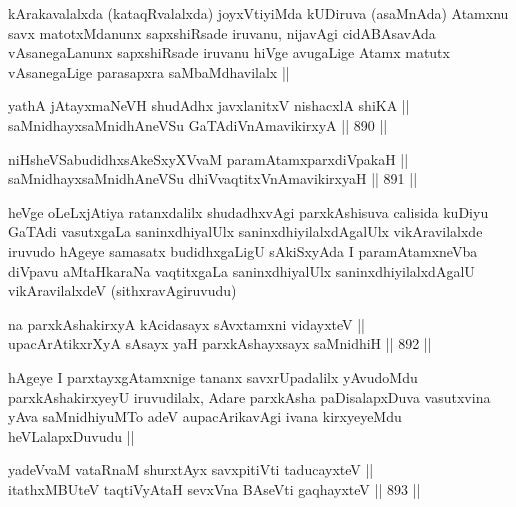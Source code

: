 \begin{artha}
kArakavalalxda (kataqRvalalxda) joyxVtiyiMda kUDiruva (asaMnAda) Atamxnu savx matotxMdanunx sapxshiRsade iruvanu, nijavAgi cidABAsavAda vAsanegaLanunx sapxshiRsade iruvanu hiVge avugaLige Atamx matutx vAsanegaLige parasapxra saMbaMdhavilalx ||
\end{artha}


\begin{shl}
yathA jAtayxmaNeVH shudAdhx javxlanitxV nishacxlA shiKA || \\
saMnidhayxsaMnidhAneVSu GaTAdiVnAmavikirxyA ||  890 ||  
\end{shl}
				
\begin{shl}
niHsheVSabudidhxsAkeSxyXVvaM paramAtamxparxdiVpakaH || \\
saMnidhayxsaMnidhAneVSu dhiVvaqtitxVnAmavikirxyaH ||  891 || 
\end{shl}

\begin{artha}
heVge oLeLxjAtiya ratanxdalilx shudadhxvAgi parxkAshisuva calisida kuDiyu GaTAdi vasutxgaLa saninxdhiyalUlx saninxdhiyilalxdAgalUlx vikAravilalxde iruvudo hAgeye samasatx budidhxgaLigU sAkiSxyAda I paramAtamxneVba diVpavu aMtaHkaraNa vaqtitxgaLa saninxdhiyalUlx saninxdhiyilalxdAgalU vikAravilalxdeV (sithxravAgiruvudu)
\end{artha}

\begin{shl}
na parxkAshakirxyA kAcidasayx sAvxtamxni vidayxteV || \\
upacArAtikxrXyA sA\s sayx yaH parxkAshayxsayx saMnidhiH ||  892 ||  
\end{shl}

\begin{artha}
hAgeye I parxtayxgAtamxnige tananx savxrUpadalilx yAvudoMdu parxkAshakirxyeyU iruvudilalx, Adare parxkAsha paDisalapxDuva vasutxvina yAva saMnidhiyuMTo adeV aupacArikavAgi ivana kirxyeyeMdu heVLalapxDuvudu ||
\end{artha}


\begin{shl}
yadeVvaM vataRnaM shurxtAyx savxpitiVti taducayxteV || \\
itathxMBUteV taqtiVyA\s taH sevxVna BAseVti gaqhayxteV ||  893 ||  
\end{shl}

